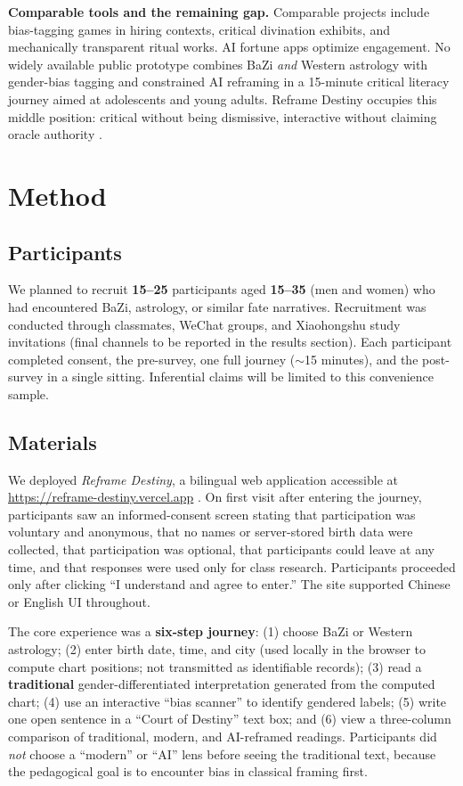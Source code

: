 \documentclass[stu,12pt,floatsintext]{apa7}
\begin{document}
\textbf{Comparable tools and the remaining gap.}
Comparable projects include bias-tagging games in hiring contexts, critical divination exhibits, and mechanically transparent ritual works. AI fortune apps optimize engagement. No widely available public prototype combines BaZi \emph{and} Western astrology with gender-bias tagging and constrained AI reframing in a 15-minute critical literacy journey aimed at adolescents and young adults. Reframe Destiny occupies this middle position: critical without being dismissive, interactive without claiming oracle authority \parencite{bender2021}.

\section{Method}

\subsection{Participants}

We planned to recruit \textbf{15--25} participants aged \textbf{15--35} (men and women) who had encountered BaZi, astrology, or similar fate narratives. Recruitment was conducted through classmates, WeChat groups, and Xiaohongshu study invitations (final channels to be reported in the results section). Each participant completed consent, the pre-survey, one full journey ($\sim$15 minutes), and the post-survey in a single sitting. Inferential claims will be limited to this convenience sample.

\subsection{Materials}

We deployed \textit{Reframe Destiny}, a bilingual web application accessible at \url{https://reframe-destiny.vercel.app} \parencite{reframeDestiny2026}. On first visit after entering the journey, participants saw an informed-consent screen stating that participation was voluntary and anonymous, that no names or server-stored birth data were collected, that participation was optional, that participants could leave at any time, and that responses were used only for class research. Participants proceeded only after clicking ``I understand and agree to enter.'' The site supported Chinese or English UI throughout.

The core experience was a \textbf{six-step journey}: (1) choose BaZi or Western astrology; (2) enter birth date, time, and city (used locally in the browser to compute chart positions; not transmitted as identifiable records); (3) read a \textbf{traditional} gender-differentiated interpretation generated from the computed chart; (4) use an interactive ``bias scanner'' to identify gendered labels; (5) write one open sentence in a ``Court of Destiny'' text box; and (6) view a three-column comparison of traditional, modern, and AI-reframed readings. Participants did \emph{not} choose a ``modern'' or ``AI'' lens before seeing the traditional text, because the pedagogical goal is to encounter bias in classical framing first.
\end{document}
